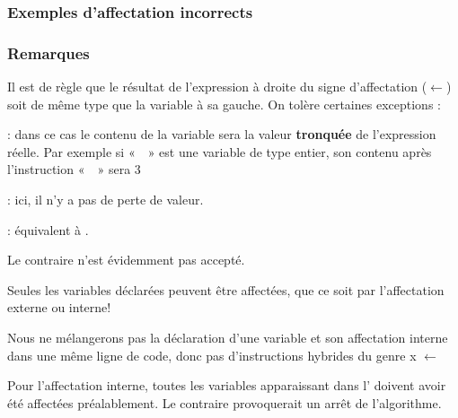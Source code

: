 			\subsubsection*{Exemples d'affectation incorrects}
			
			
			\subsubsection*{Remarques}

			\begin{liste}
			\item
				Il est de règle que le résultat de l’expression à droite du signe
				d’affectation ($\gets$) soit de
				même type que la variable à sa gauche. On tolère certaines exceptions
				:
				\begin{liste}
				\item
					 : 
					dans ce cas le contenu de la variable sera la valeur \textbf{tronquée}
					de l’expression réelle. 
					Par exemple si «~~» est
					une variable de type entier, son contenu après l’instruction
					«~~» 
					sera 3
				\item 
					 :
					ici, il n'y a pas de perte de valeur.
				\item 
					 : 
					équivalent à .
					
					Le contraire n'est évidemment pas accepté.
				\end{liste}
			\item 
				Seules les variables déclarées peuvent être affectées, que ce soit par
				l’affectation externe ou interne!
			\item 
				Nous ne mélangerons pas la déclaration d’une variable et son
				affectation interne dans une même ligne de code, donc pas
				d’instructions hybrides du genre 
				\textsf{x}{ $\gets$ }
			\item 
				Pour l’affectation interne, toutes les variables apparaissant dans
				l' doivent avoir été affectées
				préalablement. Le contraire provoquerait un arrêt de l’algorithme.
			\end{liste}
			

